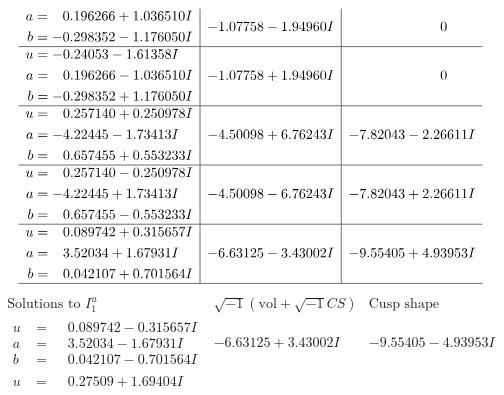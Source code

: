 \documentclass[1p]{elsarticle_modified}
\theoremstyle{definition}
\newcommand{\I}{\sqrt{-1}}
\begin{document}
$$\begin{array}{c|c|c}
\begin{aligned}
a &= \phantom{-}0.196266 + 1.036510 I \\
b &= -0.298352 - 1.176050 I\end{aligned}
 & -1.07758 - 1.94960 I & \phantom{-0.000000 } 0 \\ \hline\begin{aligned}
u &= -0.24053 - 1.61358 I \\
a &= \phantom{-}0.196266 - 1.036510 I \\
b &= -0.298352 + 1.176050 I\end{aligned}
 & -1.07758 + 1.94960 I & \phantom{-0.000000 } 0 \\ \hline\begin{aligned}
u &= \phantom{-}0.257140 + 0.250978 I \\
a &= -4.22445 - 1.73413 I \\
b &= \phantom{-}0.657455 + 0.553233 I\end{aligned}
 & -4.50098 + 6.76243 I & -7.82043 - 2.26611 I \\ \hline\begin{aligned}
u &= \phantom{-}0.257140 - 0.250978 I \\
a &= -4.22445 + 1.73413 I \\
b &= \phantom{-}0.657455 - 0.553233 I\end{aligned}
 & -4.50098 - 6.76243 I & -7.82043 + 2.26611 I \\ \hline\begin{aligned}
u &= \phantom{-}0.089742 + 0.315657 I \\
a &= \phantom{-}3.52034 + 1.67931 I \\
b &= \phantom{-}0.042107 + 0.701564 I\end{aligned}
 & -6.63125 - 3.43002 I & -9.55405 + 4.93953 I\\
 \hline 
 \end{array}$$\newpage$$\begin{array}{c|c|c}  
\text{Solutions to }I^u_{1}& \I (\text{vol} + \sqrt{-1}CS) & \text{Cusp shape}\\
 \hline 
\begin{aligned}
u &= \phantom{-}0.089742 - 0.315657 I \\
a &= \phantom{-}3.52034 - 1.67931 I \\
b &= \phantom{-}0.042107 - 0.701564 I\end{aligned}
 & -6.63125 + 3.43002 I & -9.55405 - 4.93953 I \\ \hline\begin{aligned}
u &= \phantom{-}0.27509 + 1.69404 I \\

\end{aligned}
\end{array}$$
\end{document}
